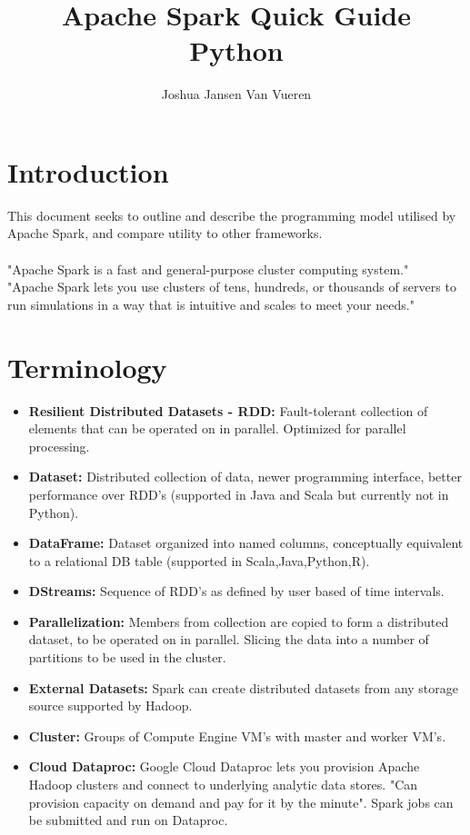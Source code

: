 \documentclass[english]{article}
\begin{document}
\title{Apache Spark Quick Guide \\
Python}


\author{Joshua Jansen Van Vueren}

\maketitle

\section*{Introduction}
This document seeks to outline and describe the programming model utilised by Apache Spark, and compare utility to other frameworks.
\\\\
"Apache Spark is a fast and general-purpose cluster computing system." 
\\
"Apache Spark lets you use clusters of tens, hundreds, or thousands of servers to run simulations in a way that is intuitive and scales to meet your needs."
\section{Terminology}
\begin{itemize}
\item \textbf{Resilient Distributed Datasets - RDD:} Fault-tolerant collection of elements that can be operated on in parallel. Optimized for parallel processing.
\item \textbf{Dataset:} Distributed collection of data, newer programming interface, better performance over RDD's (supported in Java and Scala but currently not in Python).
\item \textbf{DataFrame:} Dataset organized into named columns, conceptually equivalent to a relational DB table (supported in Scala,Java,Python,R).
\item \textbf{DStreams:} Sequence of RDD's as defined by user based of time intervals.
\item \textbf{Parallelization:} Members from collection are copied to form a distributed dataset, to be operated on in parallel. Slicing the data into a number of partitions to be used in the cluster.
\item \textbf{External Datasets:} Spark can create distributed datasets from any storage source supported by Hadoop.
\item \textbf{Cluster:} Groups of Compute Engine VM's with master and worker VM's.
\item \textbf{Cloud Dataproc:} Google Cloud Dataproc lets you provision Apache Hadoop clusters and connect to underlying analytic data stores. "Can provision capacity on demand and pay for it by the minute". Spark jobs can be submitted and run on Dataproc. 
\end{itemize}
\end{document}
